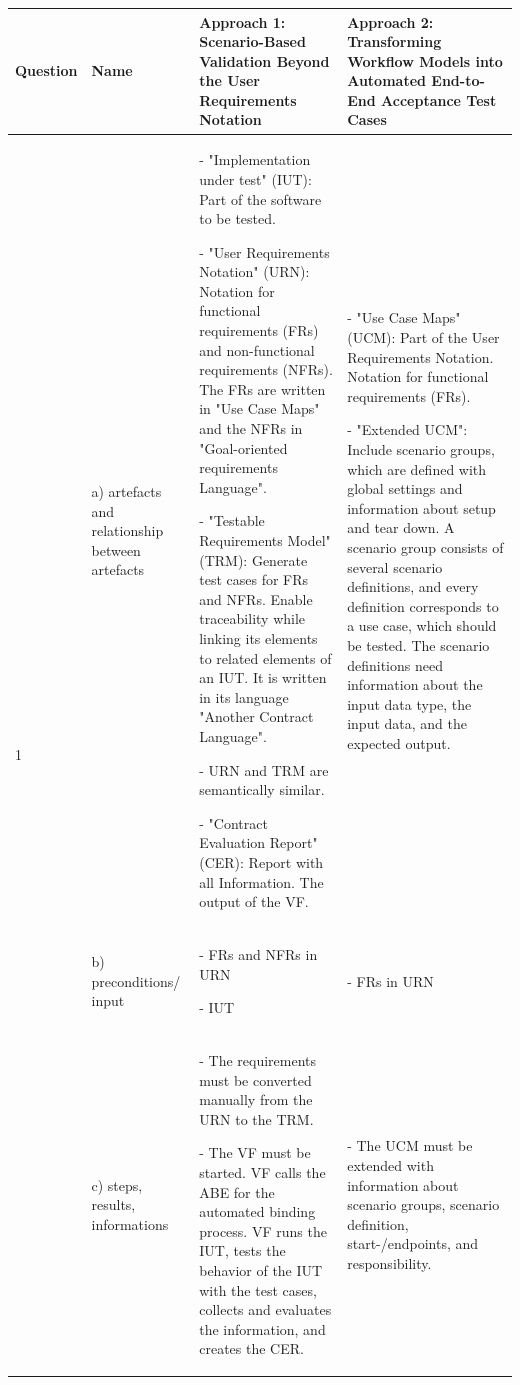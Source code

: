 \newpage
{}
\begin{landscape}
	\begin{table}
		\caption{Synthesis Matrix part 1/2.}
		\begin{longtable}[h]{|p{1.3cm}|>{\raggedright}p{2.8cm}|>{}p{9.1cm}|>{}p{9.1cm}|}
			\hline
			Question 
			& Name 
			& Approach 1: \textbf{Scenario-Based Validation Beyond the User Requirements Notation} 
			& Approach 2: \textbf{Transforming Workflow Models into Automated End-to-End Acceptance Test Cases}\\ \hline
			\multirow{3}{*}{1 \rotatebox[origin=r]{90}{\textbf{Description}}} 
			& a) artefacts and relationship between artefacts 
			&- "Implementation under test" (IUT): Part of the software to be tested. 
			
			- "User Requirements Notation" (URN): Notation for functional requirements (FRs) and non-functional requirements (NFRs). The FRs are written in "Use Case Maps" and the NFRs in "Goal-oriented requirements Language".
			
			- "Testable Requirements Model" (TRM): Generate test cases for FRs and NFRs. Enable traceability while linking its elements to related elements of an IUT. It is written in its language "Another Contract Language". 
			
			- URN and TRM are semantically similar.
			
			- "Contract Evaluation Report" (CER): Report with all Information. The output of the VF.
			&- "Use Case Maps" (UCM): Part of the User Requirements Notation. Notation for functional requirements (FRs).
			
			- "Extended UCM": Include scenario groups, which are defined with global settings and information about setup and tear down. A scenario group consists of several scenario definitions, and every definition corresponds to a use case, which should be tested. The scenario definitions need information about the input data type, the input data, and the expected output.
			\\
			\cline{2-4}
			& b) preconditions/ input 
			&  - FRs and NFRs in URN
			
			- IUT
			& 
			- FRs in URN \\
			\cline{2-4}
			& c) steps, results, informations 
			& - The requirements must be converted manually from the URN to the TRM.
			
			- The VF must be started. VF calls the ABE for the automated binding process. VF runs the IUT, tests the behavior of the IUT with the test cases, collects and evaluates the information, and creates the CER.
			&
			- The UCM must be extended with information about scenario groups, scenario definition, start-/endpoints, and responsibility.
			

\end{longtable}
\end{table}
\end{landscape}

